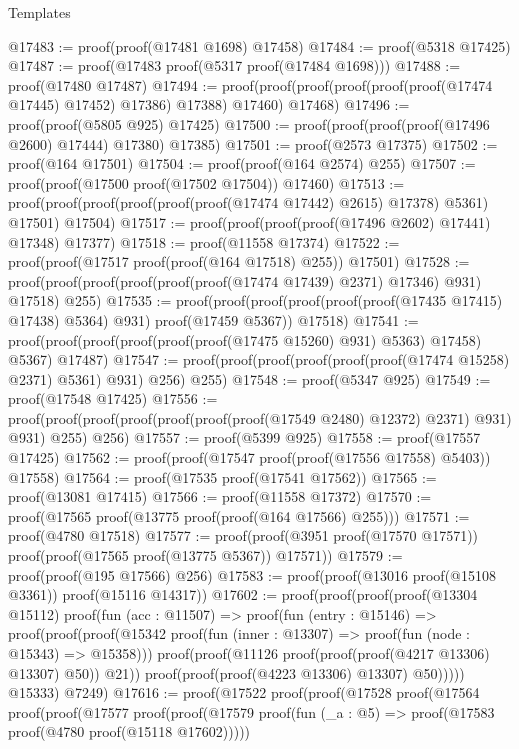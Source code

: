 \begin{lexlean}{Templates}
\begin{coremodule}
@17483 := proof(proof(@17481 @1698) @17458)
@17484 := proof(@5318 @17425)
@17487 := proof(@17483 proof(@5317 proof(@17484 @1698)))
@17488 := proof(@17480 @17487)
@17494 := proof(proof(proof(proof(proof(proof(@17474 @17445) @17452) @17386) @17388) @17460) @17468)
@17496 := proof(proof(@5805 @925) @17425)
@17500 := proof(proof(proof(proof(@17496 @2600) @17444) @17380) @17385)
@17501 := proof(@2573 @17375)
@17502 := proof(@164 @17501)
@17504 := proof(proof(@164 @2574) @255)
@17507 := proof(proof(@17500 proof(@17502 @17504)) @17460)
@17513 := proof(proof(proof(proof(proof(proof(@17474 @17442) @2615) @17378) @5361) @17501) @17504)
@17517 := proof(proof(proof(proof(@17496 @2602) @17441) @17348) @17377)
@17518 := proof(@11558 @17374)
@17522 := proof(proof(@17517 proof(proof(@164 @17518) @255)) @17501)
@17528 := proof(proof(proof(proof(proof(proof(@17474 @17439) @2371) @17346) @931) @17518) @255)
@17535 := proof(proof(proof(proof(proof(proof(@17435 @17415) @17438) @5364) @931)
        proof(@17459 @5367))
      @17518)
@17541 := proof(proof(proof(proof(proof(proof(@17475 @15260) @931) @5363) @17458) @5367) @17487)
@17547 := proof(proof(proof(proof(proof(proof(@17474 @15258) @2371) @5361) @931) @256) @255)
@17548 := proof(@5347 @925)
@17549 := proof(@17548 @17425)
@17556 := proof(proof(proof(proof(proof(proof(proof(@17549 @2480) @12372) @2371) @931) @931) @255)
      @256)
@17557 := proof(@5399 @925)
@17558 := proof(@17557 @17425)
@17562 := proof(proof(@17547 proof(proof(@17556 @17558) @5403)) @17558)
@17564 := proof(@17535 proof(@17541 @17562))
@17565 := proof(@13081 @17415)
@17566 := proof(@11558 @17372)
@17570 := proof(@17565 proof(@13775 proof(proof(@164 @17566) @255)))
@17571 := proof(@4780 @17518)
@17577 := proof(proof(@3951 proof(@17570 @17571)) proof(proof(@17565 proof(@13775 @5367)) @17571))
@17579 := proof(proof(@195 @17566) @256)
@17583 := proof(proof(@13016 proof(@15108 @3361)) proof(@15116 @14317))
@17602 := proof(proof(proof(proof(@13304 @15112)
          proof(fun (acc : @11507) =>
            proof(fun (entry : @15146) =>
              proof(proof(proof(@15342
                      proof(fun (inner : @13307) => proof(fun (node : @15343) => @15358)))
                    proof(proof(@11126 proof(proof(proof(@4217 @13306) @13307) @50)) @21))
                  proof(proof(proof(@4223 @13306) @13307) @50)))))
        @15333)
      @7249)
@17616 := proof(@17522
      proof(proof(@17528
            proof(@17564
                proof(proof(@17577
                      proof(proof(@17579
                            proof(fun (_a : @5) => proof(@17583 proof(@4780 proof(@15118 @17602)))))

\end{coremodule}
\end{lexlean}
